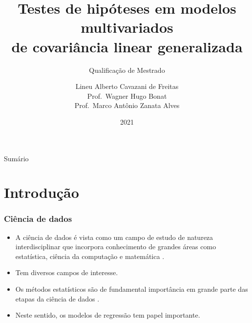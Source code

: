 \documentclass[handout,serif, professionalfont, usenames, dvipsnames, aspectratio = 169]{beamer}\usepackage[]{graphicx}\usepackage[]{color}
\title[Qualificação TH · McGLM]{
  \LARGE \bf Testes de hipóteses em modelos multivariados\\ de covariância linear generalizada 
}
\subtitle[Qualificação]{
  \large { Qualificação de Mestrado}
}
\author[Lineu Alberto $\cdot$ PPGInformatica UFPR]{%
      Lineu Alberto Cavazani de Freitas \\
      Prof.~Wagner Hugo Bonat \\
      Prof.~Marco Antônio Zanata Alves%
}
\date{2021}
\begin{document}
\begin{frame}[plain]
   \titlepage
\end{frame}


\begin{frame}{Sumário}
\tableofcontents
\end{frame}


\section{Introdução}


\begin{frame}
  \frametitle{Ciência de dados}
  \begin{itemize}
    \itemsep 2ex
  
  \item A ciência de dados é vista como um campo de estudo de natureza interdisciplinar que incorpora conhecimento de grandes áreas como estatística, ciência da computação e matemática \cite{ley2018makes}. 
  
  \item Tem diversos campos de interesse.

  \item Os métodos estatísticos são de fundamental importância em grande parte das etapas da ciência de dados \cite{weihs2018data}.
  
  \item Neste sentido, os modelos de regressão tem papel importante.
  
  \end{itemize}
\end{frame}

\end{document}
